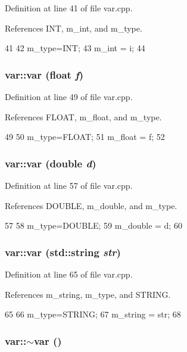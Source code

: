 Definition at line 41 of file var.cpp.

References INT, m\_\-int, and m\_\-type.


\begin{DoxyCode}
41                 {
42   m_type=INT;
43   m_int = i;
44 }
\end{DoxyCode}
\hypertarget{classvar_ab11a35ca2d25eed124494fc27f29f311}{
\subsubsection[{var}]{\setlength{\rightskip}{0pt plus 5cm}var::var (float {\em f})}}
\label{classvar_ab11a35ca2d25eed124494fc27f29f311}


Definition at line 49 of file var.cpp.

References FLOAT, m\_\-float, and m\_\-type.


\begin{DoxyCode}
49                    {
50   m_type=FLOAT;
51   m_float = f;
52 }
\end{DoxyCode}
\hypertarget{classvar_ad1a961ff2bb77b5e19d774a90974b17d}{
\subsubsection[{var}]{\setlength{\rightskip}{0pt plus 5cm}var::var (double {\em d})}}
\label{classvar_ad1a961ff2bb77b5e19d774a90974b17d}


Definition at line 57 of file var.cpp.

References DOUBLE, m\_\-double, and m\_\-type.


\begin{DoxyCode}
57                    {
58   m_type=DOUBLE;
59   m_double = d;
60 }
\end{DoxyCode}
\hypertarget{classvar_a84b88cbf0dc21a204a458b33133325d2}{
\subsubsection[{var}]{\setlength{\rightskip}{0pt plus 5cm}var::var (std::string {\em str})}}
\label{classvar_a84b88cbf0dc21a204a458b33133325d2}


Definition at line 65 of file var.cpp.

References m\_\-string, m\_\-type, and STRING.


\begin{DoxyCode}
65                         {
66   m_type=STRING;
67   m_string = str;
68 }
\end{DoxyCode}
\hypertarget{classvar_ac7d2944f98e9772ab540050ae22fe9d1}{
\subsubsection[{$\sim$var}]{\setlength{\rightskip}{0pt plus 5cm}var::$\sim$var ()}}
\label{classvar_ac7d2944f98e9772ab540050ae22fe9d1}


